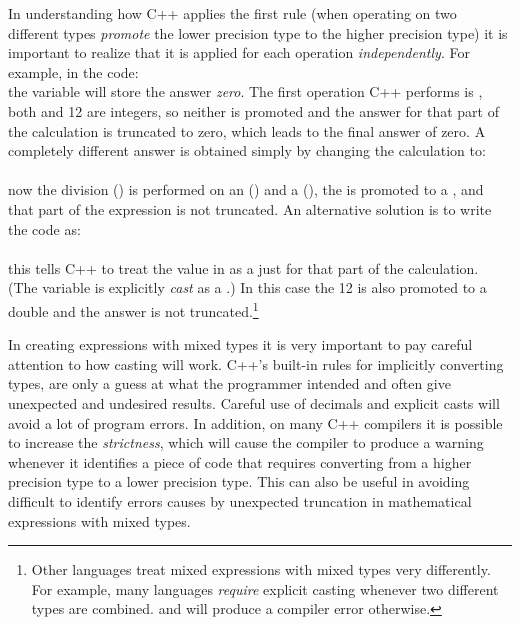 In understanding how C++ applies the first rule (when operating on two different types \emph{promote} the lower precision type to the higher precision type) it is important to realize that it is applied for each operation \emph{independently}.  For example, in the code:\\
the variable  will store the answer \emph{zero}.  The first operation C++ performs is , both  and 12 are integers, so neither is promoted and the answer for that part of the calculation is truncated to zero, which leads to the final answer of zero.  A completely different answer is obtained simply by changing the calculation to:\\
\\
now the division () is performed on an  () and a  (), the  is promoted to a , and that part of the expression is not truncated.  An alternative solution is to write the code as:\\
\\
this tells C++ to treat the value in  as a  just for that part of the calculation.  (The variable  is explicitly \emph{cast} as a .) In this case the 12 is also promoted to a double and the answer is not truncated.\footnote{Other languages treat mixed expressions with mixed types very differently.  For example, many languages \emph{require} explicit casting whenever two different types are combined. and will produce a compiler error otherwise.}

In creating expressions with mixed types it is very important to pay careful attention to how casting will work.  C++'s built-in rules for implicitly converting types, are only a guess at what the programmer intended and often give unexpected and undesired results.  Careful use of decimals and explicit casts will avoid a lot of program errors.  In addition, on many C++ compilers it is possible to increase the \emph{strictness}, which will cause the compiler to produce a warning whenever it identifies a piece of code that requires converting from a higher precision type to a lower precision type.  This can also be useful in avoiding difficult to identify errors causes by unexpected truncation in mathematical expressions with mixed types.


